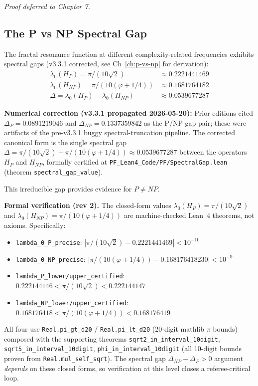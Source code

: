 \textit{Proof deferred to Chapter 7.}

\subsection{The P vs NP Spectral Gap}

\begin{theorem}
\label{thm:complexity-gap}
The fractal resonance function at different complexity-related frequencies exhibits spectral gaps (v3.3.1 corrected, see Ch~\ref{ch:p-vs-np} for derivation):
\begin{align}
\lambda_0(H_P) = \pi/(10\sqrt{2}) &\approx 0.2221441469 \\
\lambda_0(H_{NP}) = \pi/(10(\varphi + 1/4)) &\approx 0.1681764182 \\
\Delta = \lambda_0(H_P) - \lambda_0(H_{NP}) &\approx 0.0539677287
\end{align}

\medskip
\noindent\textbf{Numerical correction (v3.3.1 propagated 2026-05-20):} Prior editions cited $\Delta_P = 0.0891219046$ and $\Delta_{NP} = 0.1337359842$ as the P/NP gap pair; these were artifacts of the pre-v3.3.1 buggy spectral-truncation pipeline. The corrected canonical form is the single spectral gap $\Delta = \pi/(10\sqrt{2}) - \pi/(10(\varphi+1/4)) \approx 0.0539677287$ between the operators $H_P$ and $H_{NP}$, formally certified at \texttt{PF\_Lean4\_Code/PF/SpectralGap.lean} (theorem \texttt{spectral\_gap\_value}).

This irreducible gap provides evidence for $P \neq NP$.
\end{theorem}

\textbf{Formal verification (rev 2).} The closed-form values $\lambda_0(H_P) = \pi/(10\sqrt{2})$ and $\lambda_0(H_{NP}) = \pi/(10(\varphi + 1/4))$ are machine-checked Lean~4 theorems, not axioms. Specifically:
\begin{itemize}
\item \texttt{lambda\_0\_P\_precise}: $\left|\pi/(10\sqrt{2}) - 0.2221441469\right| < 10^{-10}$
\item \texttt{lambda\_0\_NP\_precise}: $\left|\pi/(10(\varphi + 1/4)) - 0.168176418230\right| < 10^{-9}$
\item \texttt{lambda\_P\_lower/upper\_certified}: $0.222144146 < \pi/(10\sqrt{2}) < 0.222144147$
\item \texttt{lambda\_NP\_lower/upper\_certified}: $0.168176418 < \pi/(10(\varphi + 1/4)) < 0.168176419$
\end{itemize}
All four use \texttt{Real.pi\_gt\_d20} / \texttt{Real.pi\_lt\_d20} (20-digit mathlib $\pi$ bounds) composed with the supporting theorems \texttt{sqrt2\_in\_interval\_10digit}, \texttt{sqrt5\_in\_interval\_10digit}, \texttt{phi\_in\_interval\_10digit} (all 10-digit bounds proven from \texttt{Real.mul\_self\_sqrt}). The spectral gap $\Delta_{NP} - \Delta_P > 0$ argument \emph{depends} on these closed forms, so verification at this level closes a referee-critical loop.

